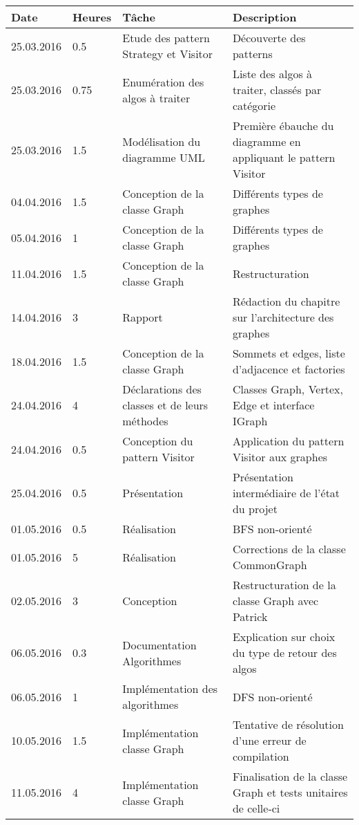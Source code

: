 \documentclass[french]{article}
\begin{document}
	\begin{longtable}{p{}|p{}|p{}|p{}}
		Date&Heures&Tâche&Description\\
		\hline \hline
		25.03.2016 & 0.5 &Etude des pattern Strategy et Visitor&Découverte des patterns\\
		25.03.2016 & 0.75&Enumération des algos à traiter&Liste des algos à traiter, classés par catégorie\\
		25.03.2016 & 1.5 &Modélisation du diagramme UML&Première ébauche du diagramme en appliquant le pattern Visitor\\
		\hline
		04.04.2016 & 1.5 &Conception de la classe Graph&Différents types de graphes\\
		05.04.2016 & 1   &Conception de la classe Graph&Différents types de graphes\\
		\hline
		11.04.2016 & 1.5 &Conception de la classe Graph&Restructuration\\
		\hline
		14.04.2016 & 3   &Rapport&Rédaction du chapitre sur l'architecture des graphes\\
		\hline
		18.04.2016 & 1.5&Conception de la classe Graph&Sommets et edges, liste d'adjacence et factories\\
		24.04.2016 & 4   &Déclarations des classes et de leurs méthodes&Classes Graph, Vertex, Edge et interface IGraph\\
		24.04.2016 & 0.5&Conception du pattern Visitor&Application du pattern Visitor aux graphes\\
		\hline
		25.04.2016 & 0.5 & Présentation & Présentation intermédiaire de l'état du projet\\
		01.05.2016 & 0.5 & Réalisation & BFS non-orienté\\
		01.05.2016 & 5 & Réalisation & Corrections de la classe CommonGraph\\
		\hline
		02.05.2016 & 3 & Conception & Restructuration de la classe Graph avec Patrick\\
		06.05.2016 & 0.3 & Documentation Algorithmes & Explication sur choix du type de retour des algos\\
		06.05.2016 & 1 & Implémentation des algorithmes & DFS non-orienté\\
		\hline
		10.05.2016 & 1.5 & Implémentation classe Graph & Tentative de résolution d'une erreur de compilation\\
		11.05.2016 & 4 & Implémentation classe Graph & Finalisation de la classe Graph et tests unitaires de celle-ci \\

\end{longtable}
\end{document}
